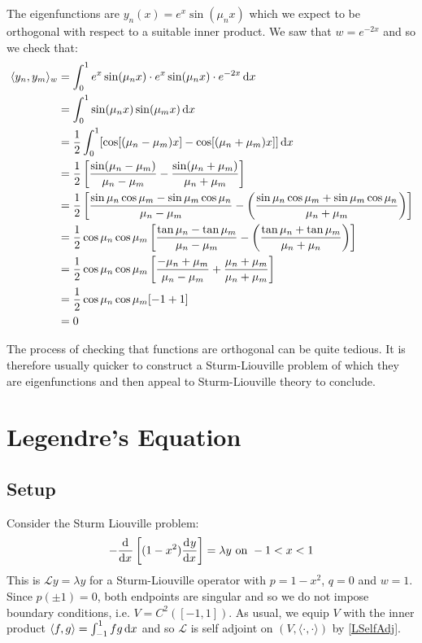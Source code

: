 \documentclass[../main.tex]{subfiles}
\begin{document}
\begin{example}
  The eigenfunctions are $y_n(x) = e^{x}\sin(\mu_n x)$ which we expect to be orthogonal with respect to a suitable inner product.
  We saw that $w = e^{-2x}$ and so we check that:
  \begin{align*}
    \langle y_n, y_m \rangle_{w} &= \int_{0}^{1} e^{x} \sin(\mu_n x) \cdot e^{x} \sin(\mu_n x) \cdot e^{-2x} \d{x} \\
                                 &= \int_{0}^{1} \sin(\mu_n x) \sin(\mu_m x) \d{x} \\
                                 &= \frac{1}{2} \int_{0}^{1} [\cos[(\mu_n - \mu_m)x] - \cos[(\mu_n + \mu_m)x]] \d{x} \\
                                 &= \frac{1}{2}\left[\frac{\sin(\mu_n - \mu_m)}{\mu_n - \mu_m} - \frac{\sin(\mu_n + \mu_m)}{\mu_n + \mu_m}\right] \\
                                 &= \frac{1}{2}\left[\frac{\sin \mu_n \cos \mu_m - \sin \mu_m \cos \mu_n}{\mu_n - \mu_m} - \left(\frac{\sin \mu_n \cos \mu_m + \sin \mu_m \cos \mu_n}{\mu_n + \mu_m}\right)\right] \\
                                 &= \frac{1}{2} \cos \mu_n \cos \mu_m \left[\frac{\tan \mu_n - \tan \mu_m}{\mu_n - \mu_m} - \left(\frac{\tan \mu_n + \tan \mu_m}{\mu_n + \mu_n}\right)\right] \\
                                 &= \frac{1}{2} \cos \mu_n \cos \mu_m \left[\frac{-\mu_n + \mu_m}{\mu_n - \mu_m} + \frac{\mu_n + \mu_m}{\mu_n + \mu_m}\right] \\
                                 &= \frac{1}{2} \cos \mu_n \cos \mu_m[-1 + 1] \\
                                 &= 0
  \end{align*}
\end{example}
\begin{remark}
  The process of checking that functions are orthogonal can be quite tedious.
  It is therefore usually quicker to construct a Sturm-Liouville problem of which they are eigenfunctions and then appeal to Sturm-Liouville theory to conclude.
\end{remark}
\section{Legendre's Equation} \label{legendre}
\subsection{Setup}
Consider the Sturm Liouville problem:
\[
  -\deriv{}{x}\left[(1 - x^2) \deriv{y}{x}\right] = \lambda y \text{ on } -1 < x < 1
\]
This is $\mathcal{L}y = \lambda y$ for a Sturm-Liouville operator with $p = 1 - x^2$, $q = 0$ and $w = 1$.
Since $p(\pm1) = 0$, both endpoints are singular and so we do not impose boundary conditions, i.e. $V = C^2([-1, 1])$.
As usual, we equip $V$ with the inner product $\langle f, g \rangle = \int_{-1}^{1} fg \d{x}$ and so $\mathcal{L}$ is self adjoint on $(V, \langle \cdot, \cdot \rangle)$ by \cref{LSelfAdj}.
\end{document}
